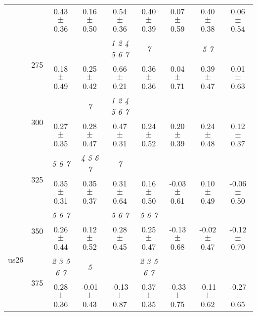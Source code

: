 \begin{table}[h]
{\begin{tabular}{
        ccccccccc}
 & & 0.43 $\pm$ 0.36& 0.16 $\pm$ 0.50& 0.54 $\pm$ 0.36& 0.40 $\pm$ 0.39& 0.07 $\pm$ 0.59& 0.40 $\pm$ 0.38& 0.06 $\pm$ 0.54 \\ 
 & \multirow{2}{*}{275}& \cellcolor[HTML]{EFEFEF} & \cellcolor[HTML]{EFEFEF} & \cellcolor[HTML]{EFEFEF} \textit{ 1 2 4 5 6 7 }& \cellcolor[HTML]{EFEFEF} \textit{ 7 }& \cellcolor[HTML]{EFEFEF} & \cellcolor[HTML]{EFEFEF} \textit{ 5 7 }& \cellcolor[HTML]{EFEFEF}  \\ 
 & & \cellcolor[HTML]{EFEFEF} 0.18 $\pm$ 0.49& \cellcolor[HTML]{EFEFEF} 0.25 $\pm$ 0.42& \cellcolor[HTML]{EFEFEF} 0.66 $\pm$ 0.21& \cellcolor[HTML]{EFEFEF} 0.36 $\pm$ 0.36& \cellcolor[HTML]{EFEFEF} 0.04 $\pm$ 0.71& \cellcolor[HTML]{EFEFEF} 0.39 $\pm$ 0.47& \cellcolor[HTML]{EFEFEF} 0.01 $\pm$ 0.63 \\ 
 & \multirow{2}{*}{300}& & \textit{ 7 }& \textit{ 1 2 4 5 6 7 }& & & &  \\ 
 & & 0.27 $\pm$ 0.35& 0.28 $\pm$ 0.47& 0.47 $\pm$ 0.31& 0.24 $\pm$ 0.52& 0.20 $\pm$ 0.39& 0.24 $\pm$ 0.48& 0.12 $\pm$ 0.37 \\ 
 & \multirow{2}{*}{325}& \cellcolor[HTML]{EFEFEF} \textit{ 5 6 7 }& \cellcolor[HTML]{EFEFEF} \textit{ 4 5 6 7 }& \cellcolor[HTML]{EFEFEF} \textit{ 7 }& \cellcolor[HTML]{EFEFEF} & \cellcolor[HTML]{EFEFEF} & \cellcolor[HTML]{EFEFEF} & \cellcolor[HTML]{EFEFEF}  \\ 
 & & \cellcolor[HTML]{EFEFEF} 0.35 $\pm$ 0.31& \cellcolor[HTML]{EFEFEF} 0.35 $\pm$ 0.37& \cellcolor[HTML]{EFEFEF} 0.31 $\pm$ 0.64& \cellcolor[HTML]{EFEFEF} 0.16 $\pm$ 0.50& \cellcolor[HTML]{EFEFEF} -0.03 $\pm$ 0.61& \cellcolor[HTML]{EFEFEF} 0.10 $\pm$ 0.49& \cellcolor[HTML]{EFEFEF} -0.06 $\pm$ 0.50 \\ 
 \multirow{4}{*}{us26} & \multirow{2}{*}{350}& \textit{ 5 6 7 }& & \textit{ 5 6 7 }& \textit{ 5 6 7 }& & &  \\ 
 & & 0.26 $\pm$ 0.44& 0.12 $\pm$ 0.52& 0.28 $\pm$ 0.45& 0.25 $\pm$ 0.47& -0.13 $\pm$ 0.68& -0.02 $\pm$ 0.47& -0.12 $\pm$ 0.70 \\ 
 & \multirow{2}{*}{375}& \cellcolor[HTML]{EFEFEF} \textit{ 2 3 5 6 7 }& \cellcolor[HTML]{EFEFEF} \textit{ 5 }& \cellcolor[HTML]{EFEFEF} & \cellcolor[HTML]{EFEFEF} \textit{ 2 3 5 6 7 }& \cellcolor[HTML]{EFEFEF} & \cellcolor[HTML]{EFEFEF} & \cellcolor[HTML]{EFEFEF}  \\ 
 & & \cellcolor[HTML]{EFEFEF} 0.28 $\pm$ 0.36& \cellcolor[HTML]{EFEFEF} -0.01 $\pm$ 0.43& \cellcolor[HTML]{EFEFEF} -0.13 $\pm$ 0.87& \cellcolor[HTML]{EFEFEF} 0.37 $\pm$ 0.35& \cellcolor[HTML]{EFEFEF} -0.33 $\pm$ 0.75& \cellcolor[HTML]{EFEFEF} -0.11 $\pm$ 0.62& \cellcolor[HTML]{EFEFEF} -0.27 $\pm$ 0.65 \\ 

\end{tabular}}
\end{table}
